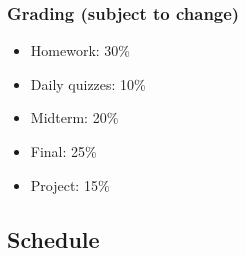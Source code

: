 \documentclass[
]{article}
\providecommand{\tightlist}{%
  \setlength{\itemsep}{0pt}\setlength{\parskip}{0pt}}
\begin{document}
\subsubsection*{Grading (subject to change)}\label{grading-subject-to-change}

\begin{itemize}
\tightlist
\item
  Homework: 30\%
\item
  Daily quizzes: 10\%
\item
  Midterm: 20\%
\item
  Final: 25\%
\item
  Project: 15\%
\end{itemize}

\subsection*{Schedule}\label{schedule}
\end{document}
